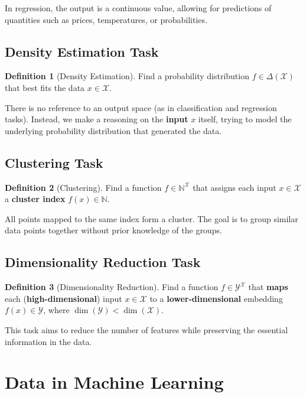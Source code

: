 \documentclass[11pt,a4paper]{article}
\theoremstyle{definition}
\newtheorem{definition}{Definition}[section]
\theoremstyle{plain}
\theoremstyle{remark}
\begin{document}
In regression, the output is a continuous value, allowing for predictions of quantities such as prices, temperatures, or probabilities.

\subsection{Density Estimation Task}

\begin{definition}[Density Estimation]
Find a probability distribution $f \in \Delta(\mathcal{X})$ that best fits the data $x \in \mathcal{X}$.
\end{definition}

There is no reference to an output space (as in classification and regression tasks). Instead, we make a reasoning on the \textbf{input} $x$ itself, trying to model the underlying probability distribution that generated the data.

\subsection{Clustering Task}

\begin{definition}[Clustering]
Find a function $f \in \mathbb{N}^{\mathcal{X}}$ that assigns each input $x \in \mathcal{X}$ a \textbf{cluster index} $f(x) \in \mathbb{N}$.
\end{definition}

All points mapped to the same index form a cluster. The goal is to group similar data points together without prior knowledge of the groups.

\subsection{Dimensionality Reduction Task}

\begin{definition}[Dimensionality Reduction]
Find a function $f \in \mathcal{Y}^{\mathcal{X}}$ that \textbf{maps} each (\textbf{high-dimensional}) input $x \in \mathcal{X}$ to a \textbf{lower-dimensional} embedding $f(x) \in \mathcal{Y}$, where $\dim(\mathcal{Y}) < \dim(\mathcal{X})$.
\end{definition}

This task aims to reduce the number of features while preserving the essential information in the data.

\section{Data in Machine Learning}
\end{document}
